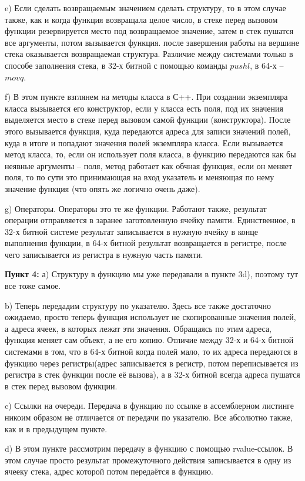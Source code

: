 \documentclass[a4paper,12pt]{article}
\begin{document}
e) Если сделать возвращаемым значением сделать структуру, то в этом случае также, как и когда функция возвращала целое число, в стеке перед вызовом функции резервируется место под возвращаемое значение, затем в стек пушатся все аргументы, потом вызывается функция. после завершения работы на вершине стека оказывается возвращаемая структура. Различие между системами только в способе заполнения стека, в 32-х битной с помощью команды $pushl$, в 64-х -- $movq$.  

f) В этом пункте взглянем на методы класса в С++. При создании экземпляра класса  вызывается его конструктор, если у класса есть поля, под их значения выделяется место в стеке перед вызовом самой функции (конструктора). После этого вызывается функция, куда передаются адреса для записи значений полей, куда в итоге и попадают значения полей экземпляра класса. Если вызывается метод класса, то, если он использует поля класса, в функцию передаются как бы неявные аргументы -- поля, метод работает как обчная функция, если он меняет поля, то по сути это принимающая на вход указатель и меняющая по нему значение функция (что опять же логично очень даже). 

g) Операторы. Операторы это те же функции. Работают также, результат операции отправляется в заранее заготовленную ячейку памяти. Единственное, в 32-х битной системе результат записывается в нужную ячейку в конце выполнения функции, в 64-х битной результат возвращается в регистре, после чего записывается из регистра в нужную часть памяти.  

\textbf{Пункт 4:}
а) Структуру в функцию мы уже передавали в пункте 3d), поэтому тут все тоже самое.

b) Теперь передадим структуру по указателю. Здесь все также достаточно ожидаемо, просто теперь функция использует не скопированные значения полей, а адреса ячеек, в которых лежат эти значения. Обращаясь по этим адреса, функция меняет сам объект, а не его копию. Отличие между 32-х и 64-х битной системами в том, что в 64-х битной когда полей мало, то их адреса передаются в функцию через регистры(адрес записывается в регистр, потом переписывается из регистра в стек функции после её вызова), а в 32-х битной всегда адреса пушатся в стек перед вызовом функции.    

c) Ссылки на очереди. Передача в функцию по ссылке в ассемблерном листинге никоим образом не отличается от передачи по указателю. Все абсолютно также, как и в предыдущем пункте.

d) В этом пункте рассмотрим передачу в функцию с помощью rvalue-ссылок. В этом случае просто результат промежуточного действия записывается в одну из ячееку стека, адрес которой потом передаётся в функцию.  
 
\end{document}

